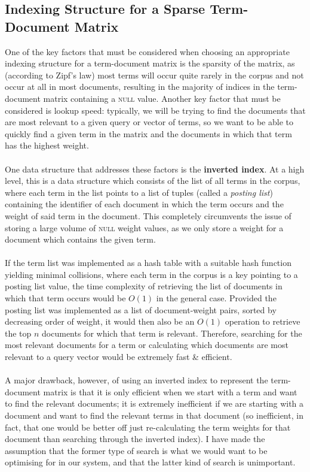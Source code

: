 \documentclass[a4paper]{article}
\begin{document}
\subsection{Indexing Structure for a Sparse Term-Document Matrix}
One of the key factors that must be considered when choosing an appropriate indexing structure for a term-document matrix is the sparsity of the matrix, as (according to Zipf's law) most terms will occur quite rarely in the corpus and not occur at all in most documents, resulting in the majority of indices in the term-document matrix containing a \textsc{null} value.
Another key factor that must be considered is lookup speed: typically, we will be trying to find the documents that are most relevant to a given query or vector of terms, so we want to be able to quickly find a given term in the matrix and the documents in which that term has the highest weight.
\\\\
One data structure that addresses these factors is the \textbf{inverted index}.
At a high level, this is a data structure which consists of the list of all terms in the corpus, where each term in the list points to a list of tuples (called a \textit{posting list}) containing the identifier of each document in which the term occurs and the weight of said term in the document.
This completely circumvents the issue of storing a large volume of \textsc{null} weight values, as we only store a weight for a document which contains the given term.
\\\\
If the term list was implemented as a hash table with a suitable hash function yielding minimal collisions, where each term in the corpus is a key pointing to a posting list value, the time complexity of retrieving the list of documents in which that term occurs would be $O(1)$ in the general case.
Provided the posting list was implemented as a list of document-weight pairs, sorted by decreasing order of weight, it would then also be an $O(1)$ operation to retrieve the top $n$ documents for which that term is relevant.
Therefore, searching for the most relevant documents for a term or calculating which documents are most relevant to a query vector would be extremely fast \& efficient. 
\\\\
A major drawback, however, of using an inverted index to represent the term-document matrix is that it is only efficient when we start with a term and want to find the relevant documents; it is extremely inefficient if we are starting with a document and want to find the relevant terms in that document (so inefficient, in fact, that one would be better off just re-calculating the term weights for that document than searching through the inverted index).
I have made the assumption that the former type of search is what we would want to be optimising for in our system, and that the latter kind of search is unimportant.
\end{document}
